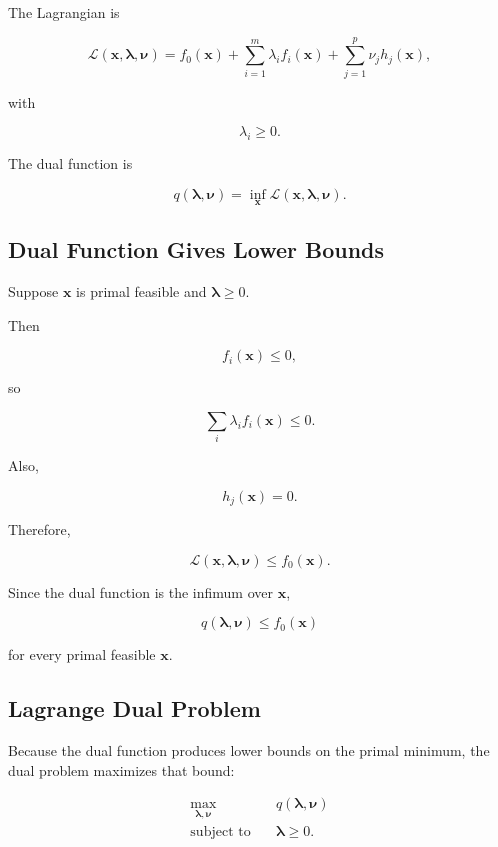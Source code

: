 The Lagrangian is

\[
\boxed{
\mathcal{L}
(
\mathbf{x},
\boldsymbol{\lambda},
\boldsymbol{\nu}
)
=
f_0(\mathbf{x})
+
\sum_{i=1}^{m}
\lambda_if_i(\mathbf{x})
+
\sum_{j=1}^{p}
\nu_jh_j(\mathbf{x}),
}
\]

with

\[
\lambda_i\geq0.
\]

The dual function is

\[
\boxed{
q
(
\boldsymbol{\lambda},
\boldsymbol{\nu}
)
=
\inf_{\mathbf{x}}
\mathcal{L}
(
\mathbf{x},
\boldsymbol{\lambda},
\boldsymbol{\nu}
).
}
\]

\subsection{Dual Function Gives Lower Bounds}
\label{subsec:dual-function-lower-bound}

Suppose \(\mathbf{x}\) is primal feasible and
\(\boldsymbol{\lambda}\geq0\).

Then

\[
f_i(\mathbf{x})\leq0,
\]

so

\[
\sum_i
\lambda_if_i(\mathbf{x})
\leq0.
\]

Also,

\[
h_j(\mathbf{x})=0.
\]

Therefore,

\[
\mathcal{L}
(
\mathbf{x},
\boldsymbol{\lambda},
\boldsymbol{\nu}
)
\leq
f_0(\mathbf{x}).
\]

Since the dual function is the infimum over \(\mathbf{x}\),

\[
\boxed{
q
(
\boldsymbol{\lambda},
\boldsymbol{\nu}
)
\leq
f_0(\mathbf{x})
}
\]

for every primal feasible \(\mathbf{x}\).

\subsection{Lagrange Dual Problem}
\label{subsec:lagrange-dual-problem}

Because the dual function produces lower bounds on the primal minimum,
the dual problem maximizes that bound:

\[
\boxed{
\begin{aligned}
\max_{\boldsymbol{\lambda},\boldsymbol{\nu}}
\quad&
q
(
\boldsymbol{\lambda},
\boldsymbol{\nu}
)
\\
\text{subject to}
\quad&
\boldsymbol{\lambda}\geq0.
\end{aligned}
}
\]

